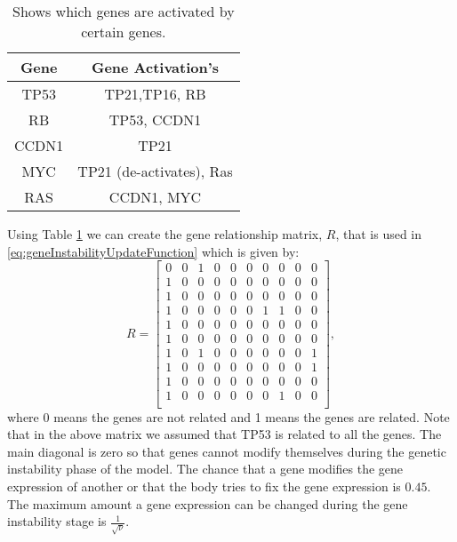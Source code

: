 \documentclass[\main/thesis.tex]{subfiles}
\begin{document}
\begin{table}[H]
	\centering
	\begin{tabular}{| c c |}
		\hline
		Gene & Gene Activation's \\
		\hline\hline
		TP53 & TP21,TP16, RB \\
		\hline
		RB & TP53, CCDN1 \\
		\hline
		CCDN1 & TP21 \\
		\hline
		MYC & TP21 (de-activates), Ras \\
		\hline
		RAS & CCDN1, MYC \\
		\hline
	\end{tabular}
	\caption{Shows which genes are activated by certain genes.}
	\label{table:geneRelations}
\end{table}
Using Table \ref{table:geneRelations} we can create the gene relationship matrix, $R$, that is used in \eqref{eq:geneInstabilityUpdateFunction} which is given by:
\begin{equation}
    R {=}
    \begin{bmatrix}
        0 & 0 & 1 & 0 & 0 & 0 & 0 & 0 & 0 & 0 \\
        1 & 0 & 0 & 0 & 0 & 0 & 0 & 0 & 0 & 0 \\
        1 & 0 & 0 & 0 & 0 & 0 & 0 & 0 & 0 & 0 \\
        1 & 0 & 0 & 0 & 0 & 0 & 1 & 1 & 0 & 0 \\
        1 & 0 & 0 & 0 & 0 & 0 & 0 & 0 & 0 & 0 \\
        1 & 0 & 0 & 0 & 0 & 0 & 0 & 0 & 0 & 0 \\
        1 & 0 & 1 & 0 & 0 & 0 & 0 & 0 & 0 & 1 \\
        1 & 0 & 0 & 0 & 0 & 0 & 0 & 0 & 0 & 1 \\
        1 & 0 & 0 & 0 & 0 & 0 & 0 & 0 & 0 & 0 \\
        1 & 0 & 0 & 0 & 0 & 0 & 0 & 1 & 0 & 0 \\
    \end{bmatrix},
    \label{param:R}
\end{equation}
where 0 means the genes are not related and 1 means the genes are related.
Note that in the above matrix we assumed that TP53 is related to all the genes. The main diagonal is zero so that genes cannot modify themselves during the genetic instability phase of the model. %
The chance that a gene modifies the gene expression of another or that the body tries to fix the gene expression is $0.45$. The maximum amount a gene expression can be changed during the gene instability stage is $\frac{1}{\sqrt{\nu}}$.
\end{document}
